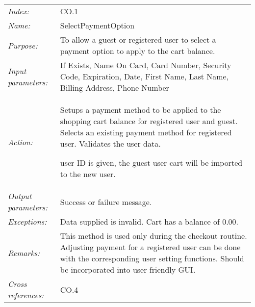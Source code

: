\documentclass[10pt,letter]{article}
\begin{document}
\begin{tabularx}{\textwidth}{l X}

    \it{Index:} & CO.1 \\

    \it{Name:} & SelectPaymentOption \\

    \it{Purpose:} & To allow a guest or registered user to select a payment option to apply to the cart balance. \\

    \it{Input parameters:} & If Exists, Name On Card, Card Number, Security Code, Expiration, Date, First Name, Last Name, Billing Address, Phone Number \\

    \it{Action:} & Setups a payment method to be applied to the shopping cart balance for registered user and guest. Selects an existing payment method for registered user. Validates the user data.

    user ID is given, the guest user cart will be imported to the new user.\\

    \it{Output parameters:} & Success or failure message. \\

    \it{Exceptions:} & 

    Data supplied is invalid. Cart has a balance of $0.00$. \\

    \it{Remarks:} & This method is used only during the checkout routine. Adjusting payment for a registered user can be done with the corresponding  user setting functions. Should be incorporated into user friendly GUI.\\

    \it{Cross references:} & CO.4 \\

    \hline

\end{tabularx}
\end{document}
